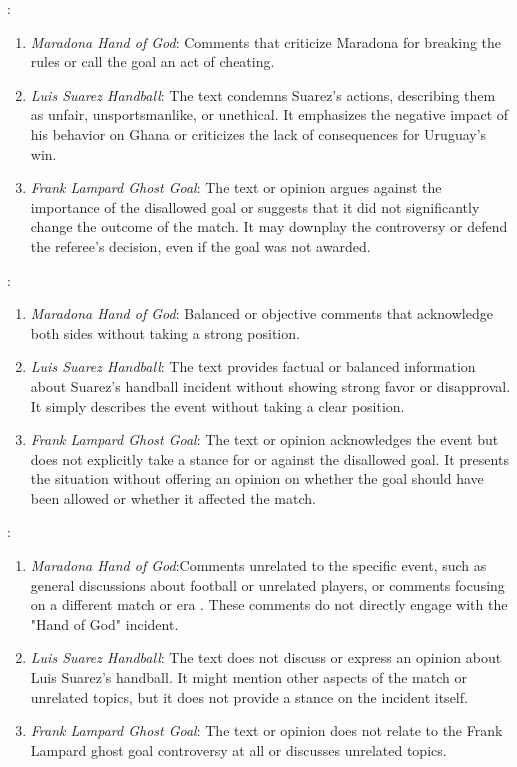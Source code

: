 \documentclass{article}
\begin{document}
\begin{enumerate}
\begin{enumerate}
\end{enumerate}
:
\begin{enumerate}
    \item \textit{Maradona Hand of God}: Comments that criticize Maradona for breaking the rules or call the goal an act of cheating. 

       \item \textit{Luis Suarez Handball}: The text condemns Suarez's actions, describing them as unfair, unsportsmanlike, or unethical. It emphasizes the negative impact of his behavior on Ghana or criticizes the lack of consequences for Uruguay’s win.
     \item \textit{Frank Lampard Ghost Goal}: The text or opinion argues against the importance of the disallowed goal or suggests that it did not significantly change the outcome of the match. It may downplay the controversy or defend the referee's decision, even if the goal was not awarded.
    
       
\end{enumerate}
:

\begin{enumerate}
    \item \textit{Maradona Hand of God}: Balanced or objective comments that acknowledge both sides without taking a strong position.
       \item \textit{Luis Suarez Handball}: The text provides factual or balanced information about Suarez’s handball incident without showing strong favor or disapproval. It simply describes the event without taking a clear position.
     \item \textit{Frank Lampard Ghost Goal}: The text or opinion acknowledges the event but does not explicitly take a stance for or against the disallowed goal. It presents the situation without offering an opinion on whether the goal should have been allowed or whether it affected the match.
    
    
\end{enumerate}
:

\begin{enumerate}
    \item \textit{Maradona Hand of God}:Comments unrelated to the specific event, such as general discussions about football or unrelated players, or comments focusing on a different match or era . These comments do not directly engage with the "Hand of God" incident.
       \item \textit{Luis Suarez Handball}: The text does not discuss or express an opinion about Luis Suarez’s handball. It might mention other aspects of the match or unrelated topics, but it does not provide a stance on the incident itself.
     \item \textit{Frank Lampard Ghost Goal}: The text or opinion does not relate to the Frank Lampard ghost goal controversy at all or discusses unrelated topics.

\end{enumerate}

\end{enumerate}
\end{document}

